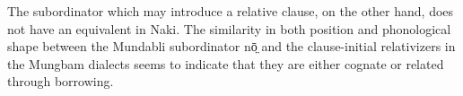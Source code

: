 \documentclass[10pt,twoside]{article}
\def\ci#1{{\ipaFont #1}}
\begin{document}
The subordinator which may introduce a relative clause, on the other hand, does not have an equivalent in 
Naki. The similarity in both position and phonological shape between the Mundabli subordinator \ci{nō̤} 
and the clause-initial relativizers in the Mungbam dialects seems to indicate that they are either cognate or related through borrowing.

\end{document}

